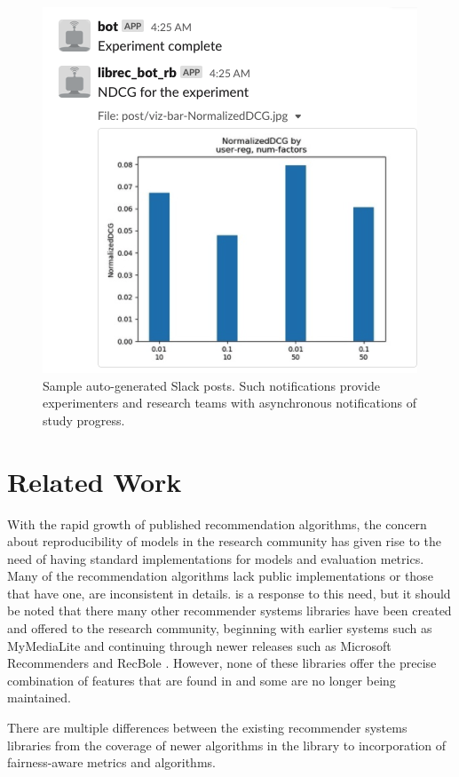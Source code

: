 \begin{figure}[ht!]
    \centering
    \includegraphics[width=0.8\linewidth]{figs/chapter6-librecauto/slack-post.png}
    \caption{Sample auto-generated Slack posts. Such notifications provide experimenters and research teams with asynchronous notifications of study progress.}
    \label{fig:slack}
    \vspace{-0.15in}
\end{figure}

\section{Related Work}

With the rapid growth of published recommendation algorithms, the concern about reproducibility of models in the research community has given rise to the need of having standard implementations for models and evaluation metrics. Many of the recommendation algorithms lack public implementations or those that have one, are inconsistent in details. \libauto{} is a response to this need, but it should be noted that there many other recommender systems libraries have been created and offered to the research community, beginning with earlier systems such as MyMediaLite \cite{MyMediaLite} and continuing through newer releases such as Microsoft Recommenders \cite{MicrosoftRecommenders} and RecBole \cite{recbole}. However, none of these libraries offer the precise combination of features that are found in \libauto{} and some are no longer being maintained.

There are multiple differences between the existing recommender systems libraries from the coverage of newer algorithms in the library to incorporation of fairness-aware metrics and algorithms.

